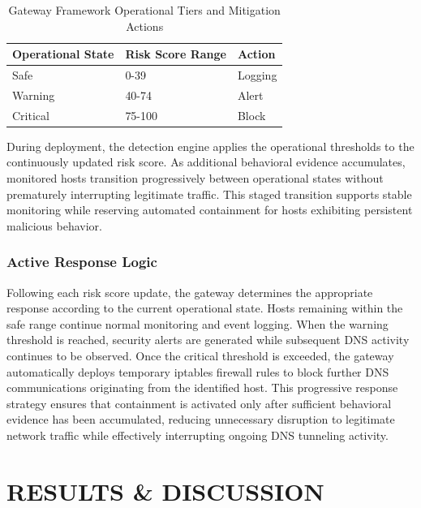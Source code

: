 \documentclass[14pt, a4paper, oneside]{report}
\begin{document}
\begin{table}[H]
\centering
\caption{Gateway Framework Operational Tiers and Mitigation Actions}
\vspace{0.1cm}
\label{tab:operational_states}
\bgroup
\normalsize
\renewcommand{\arraystretch}{1.5}
\begin{tabular}{|l|p{1.5cm}|l|}
\hline
\textbf{Operational State} & \textbf{Risk Score Range} & \textbf{Action} \\ \hline
Safe & 0-39 & Logging \\ \hline
Warning & 40-74 & Alert \\ \hline
Critical & 75-100 & Block \\ \hline
\end{tabular}
\egroup
\end{table}
During deployment, the detection engine applies the operational thresholds to the continuously updated risk score. As additional behavioral evidence accumulates, monitored hosts transition progressively between operational states without prematurely interrupting legitimate traffic. This staged transition supports stable monitoring while reserving automated containment for hosts exhibiting persistent malicious behavior.

\subsection{Active Response Logic}
Following each risk score update, the gateway determines the appropriate response according to the current operational state. Hosts remaining within the safe range continue normal monitoring and event logging. When the warning threshold is reached, security alerts are generated while subsequent DNS activity continues to be observed. Once the critical threshold is exceeded, the gateway automatically deploys temporary iptables firewall rules to block further DNS communications originating from the identified host. This progressive response strategy ensures that containment is activated only after sufficient behavioral evidence has been accumulated, reducing unnecessary disruption to legitimate network traffic while effectively interrupting ongoing DNS tunneling activity.





\chapter{RESULTS \& DISCUSSION}
\label{chapt:evaluation}
\end{document}
